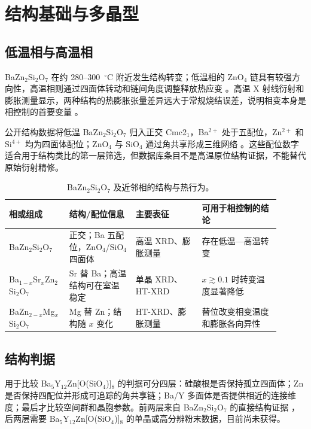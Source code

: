 \section{结构基础与多晶型}

\subsection{低温相与高温相}

BaZn$_2$Si$_2$O$_7$ 在约 280--300~$^\circ$C 附近发生结构转变；低温相的 ZnO$_4$ 链具有较强方向性，高温相则通过四面体转动和链间角度调整释放热应变 \cite{lin1999phase,thieme2015ba1}。高温 X 射线衍射和膨胀测量显示，两种结构的热膨胀张量差异远大于常规烧结误差，说明相变本身是相控制的首要变量 \cite{kerstan2012thermal,thieme2016very}。

公开结构数据将低温 BaZn$_2$Si$_2$O$_7$ 归入正交 Cmc2$_1$，Ba$^{2+}$ 处于五配位，Zn$^{2+}$ 和 Si$^{4+}$ 均为四面体配位；ZnO$_4$ 与 SiO$_4$ 通过角共享形成三维网络 \cite{available2020materials}。这些配位数字适合用于结构类比的第一层筛选，但数据库条目不是高温原位结构证据，不能替代原始衍射精修。

\begin{table}[t]
\centering
\caption{BaZn$_2$Si$_2$O$_7$ 及近邻相的结构与热行为。}
\begin{tabular}{P{0.20\linewidth}P{0.22\linewidth}P{0.22\linewidth}P{0.26\linewidth}}
\toprule
相或组成 & 结构/配位信息 & 主要表征 & 可用于相控制的结论 \\
\midrule
BaZn$_2$Si$_2$O$_7$ & 正交；Ba 五配位，ZnO$_4$/SiO$_4$ 四面体 & 高温 XRD、膨胀测量 & 存在低温—高温转变 \cite{lin1999phase,available2020materials} \\
Ba$_{1-x}$Sr$_x$Zn$_2$Si$_2$O$_7$ & Sr 替 Ba；高温结构可在室温稳定 & 单晶 XRD、HT-XRD & $x\gtrsim0.1$ 时转变温度显著降低 \cite{thieme2015ba1,thieme2016very} \\
BaZn$_{2-x}$Mg$_x$Si$_2$O$_7$ & Mg 替 Zn；结构随 $x$ 变化 & HT-XRD、膨胀测量 & 替位改变相变温度和膨胀各向异性 \cite{kerstan2012thermal} \\
\bottomrule
\end{tabular}
\end{table}

\subsection{结构判据}

用于比较 Ba$_5$Y$_{12}$Zn[O(SiO$_4$)]$_8$ 的判据可分四层：硅酸根是否保持孤立四面体；Zn 是否保持四配位并形成可追踪的角共享链；Ba/Y 多面体是否提供相近的连接维度；最后才比较空间群和晶胞参数。前两层来自 BaZn$_2$Si$_2$O$_7$ 的直接结构证据 \cite{lin1999phase,available2020materials}，后两层需要 Ba$_5$Y$_{12}$Zn[O(SiO$_4$)]$_8$ 的单晶或高分辨粉末数据，目前尚未获得。
